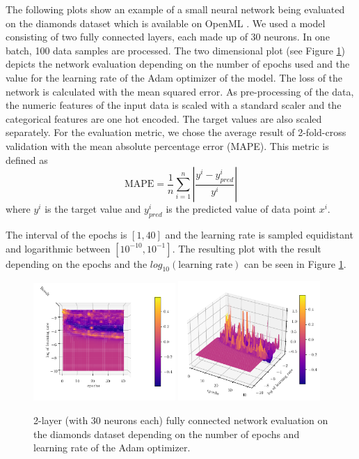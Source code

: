 The following plots show an example of a small neural network being evaluated on the diamonds dataset which is available on OpenML \cite{feurer-arxiv19a}. We used a model consisting of two fully connected layers, each made up of 30 neurons. In one batch, 100 data samples are processed. The two dimensional plot (see Figure \ref{fig:analysis_model_training}) depicts the network evaluation depending on the number of epochs used and the value for the learning rate of the Adam optimizer of the model. The loss of the network is calculated with the mean squared error. As pre-processing of the data, the numeric features of the input data is scaled with a standard scaler and the categorical features are one hot encoded. The target values are also scaled separately. For the evaluation metric, we chose the average result of 2-fold-cross validation with the mean absolute percentage error (MAPE). This metric is defined as 
\begin{equation}
 	\text{MAPE} = \frac{1}{n} \sum_{i=1}^{n}\left|\frac{y^i - y^i_{pred}}{y^i}\right|
\end{equation}
where $ y^i $ is the target value and $ y^i_{pred} $ is the predicted value of data point $ x^i $.

The interval of the epochs is $ [1, 40] $ and the learning rate is sampled equidistant and logarithmic between $ [10^{-10}, 10^{-1}] $. The resulting plot with the result depending on the epochs and the $ log_{10}(\text{learning rate}) $ can be seen in Figure \ref{fig:analysis_model_training}.

\begin{figure}[htbp!]
	\centering
	\includegraphics[width=0.48\textwidth]{figures/Results/Machine_learning/1000_evaluations/Network_above}
	\includegraphics[width=0.48\textwidth]{figures/Results/Machine_learning/1000_evaluations/Network_normal}
	
	\caption{ 2-layer (with 30 neurons each) fully connected network evaluation on the diamonds dataset depending on the number of epochs and learning rate of the Adam optimizer. }
	\label{fig:analysis_model_training}
\end{figure}

